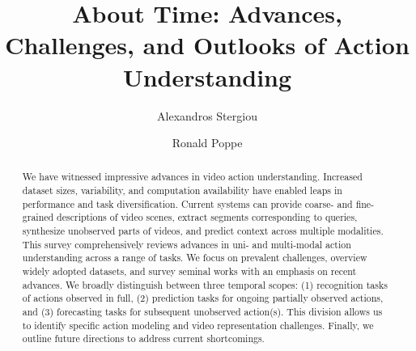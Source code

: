 \documentclass[smallextended,twocolumn,natbib]{svjour3}
\begin{document}
\sloppy

\title{About Time: Advances, Challenges, and Outlooks of Action Understanding}




\author{Alexandros Stergiou \and Ronald Poppe}


\maketitle

\begin{abstract}
We have witnessed impressive advances in video action understanding. Increased dataset sizes, variability, and computation availability have enabled leaps in performance and task diversification. Current systems can provide coarse- and fine-grained descriptions of video scenes, extract segments corresponding to queries, synthesize unobserved parts of videos, and predict context across multiple modalities. This survey comprehensively reviews advances in uni- and multi-modal action understanding across a range of tasks. We focus on prevalent challenges, overview widely adopted datasets, and survey seminal works with an emphasis on recent advances. We broadly distinguish between three temporal scopes: (1) recognition tasks of actions observed in full, (2) prediction tasks for ongoing partially observed actions, and (3) forecasting tasks for subsequent unobserved action(s). This division allows us to identify specific action modeling and video representation challenges. Finally, we outline future directions to address current shortcomings.
\end{abstract}



\newpage
\end{document}

